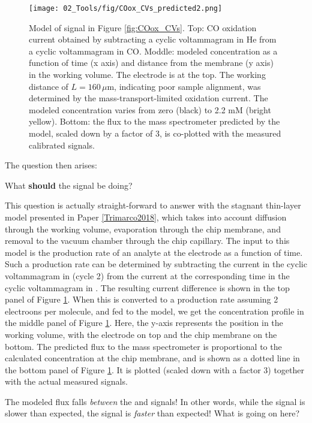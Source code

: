 \begin{figure}[t]
	\centering
	\texttt{[image: 02\_Tools/fig/COox\_CVs\_predicted2.png]}
	\caption{Model of  signal in Figure \ref{fig:COox_CVs}. Top: CO oxidation current obtained by subtracting a cyclic voltammagram in He from a cyclic voltammagram in CO. Moddle: modeled concentration as a function of time (x axis) and distance from the membrane (y axis) in the working volume. The electrode is at the top. The working distance of $L=160\,\mu$m, indicating poor sample alignment, was determined by the mass-transport-limited  oxidation current. The modeled  concentration varies from zero (black) to 2.2 mM (bright yellow). Bottom: the  flux to the mass spectrometer predicted by the model, scaled down by a factor of 3, is co-plotted with the measured calibrated  signals.}
	\label{fig:COox_pred}
\end{figure}
The question then arises:
\begin{question} 
What \textbf{should} the  signal be doing?
\end{question}
This question is actually straight-forward to answer with the stagnant thin-layer model presented in Paper \ref{Trimarco2018}, which takes into account diffusion through the working volume, evaporation through the chip membrane, and removal to the vacuum chamber through the chip capillary. The input to this model is the production rate of an analyte at the electrode as a function of time. Such a production rate can be determined by subtracting the current in the cyclic voltammagram in  (cycle 2) from the current at the corresponding time in the cyclic voltammagram in . The resulting current difference is shown in the top panel of Figure \ref{fig:COox_pred}. When this is converted to a  production rate assuming 2 electroons per  molecule, and fed to the model, we get the concentration profile in the middle panel of Figure \ref{fig:COox_pred}. Here, the y-axis represents the position in the working volume, with the electrode on top and the chip membrane on the bottom. The predicted flux to the mass spectrometer is proportional to the calculated concentration at the chip membrane, and is shown as a dotted line in the bottom panel of Figure \ref{fig:COox_pred}. It is plotted (scaled down with a factor 3) together with the actual measured  signals.

The modeled flux falls \textit{between} the  and  signals! In other words, while the  signal is slower than expected, the  signal is \textit{faster} than expected! What is going on here?

